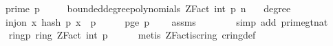\begin{isabellebody}
\ \ \ {\isachardoublequoteopen}prime\ p{\isachardoublequoteclose}\isanewline
\ \ \ {\isachardoublequoteopen}{\isasymomega}\ {\isasymin}\ bounded{\isacharunderscore}{\kern0pt}degree{\isacharunderscore}{\kern0pt}polynomials\ {\isacharparenleft}{\kern0pt}ZFact\ {\isacharparenleft}{\kern0pt}int\ p{\isacharparenright}{\kern0pt}{\isacharparenright}{\kern0pt}\ n{\isachardoublequoteclose}\isanewline
\ \ \ {\isachardoublequoteopen}degree\ {\isasymomega}\ {\isacharequal}{\kern0pt}\ {}{\isachardoublequoteclose}\isanewline
\ \ \ {\isachardoublequoteopen}inj{\isacharunderscore}{\kern0pt}on\ {\isacharparenleft}{\kern0pt}{\isasymlambda}x{\isachardot}{\kern0pt}\ hash\ p\ x\ {\isasymomega}{\isacharparenright}{\kern0pt}\ {\isacharbraceleft}{\kern0pt}{}{\isachardot}{\kern0pt}{\isachardot}{\kern0pt}{\isacharless}{\kern0pt}p{\isacharbraceright}{\kern0pt}{\isachardoublequoteclose}\isanewline
%
\isadelimproof
%
\endisadelimproof
%
\isatagproof
{}\isamarkupfalse%
\ {\isacharminus}{\kern0pt}\isanewline
\ \ \isamarkupfalse%
\ p{\isacharunderscore}{\kern0pt}ge{\isacharunderscore}{\kern0pt}{}{\isacharcolon}{\kern0pt}\ {\isachardoublequoteopen}p\ {\isachargreater}{\kern0pt}\ {}{\isachardoublequoteclose}\ \isamarkupfalse%
\ assms{\isacharparenleft}{\kern0pt}{}{\isacharparenright}{\kern0pt}\ \ \isanewline
\ \ \ \ \isamarkupfalse%
\ {\isacharparenleft}{\kern0pt}simp\ add{\isacharcolon}{\kern0pt}\ prime{\isacharunderscore}{\kern0pt}gt{\isacharunderscore}{\kern0pt}{}{\isacharunderscore}{\kern0pt}nat{\isacharparenright}{\kern0pt}\isanewline
\isanewline
\ \ \isamarkupfalse%
\ ring{\isacharunderscore}{\kern0pt}p{\isacharcolon}{\kern0pt}\ {\isachardoublequoteopen}ring\ {\isacharparenleft}{\kern0pt}ZFact\ {\isacharparenleft}{\kern0pt}int\ p{\isacharparenright}{\kern0pt}{\isacharparenright}{\kern0pt}{\isachardoublequoteclose}\isanewline
\ \ \ \ \isamarkupfalse%
\ {\isacharparenleft}{\kern0pt}metis\ ZFact{\isacharunderscore}{\kern0pt}is{\isacharunderscore}{\kern0pt}cring\ cring{\isacharunderscore}{\kern0pt}def{\isacharparenright}{\kern0pt}\isanewline
\isanewline
\ \ \isamarkupfalse%

\end{isabellebody}
